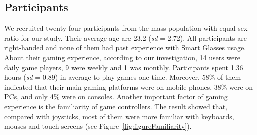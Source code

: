 \documentclass{sigchi}
\begin{document}
  \subsection {Participants}
  We recruited twenty-four participants from the mass population with equal sex ratio for our study. Their average age are 23.2 (\textsl{sd} = 2.72). All participants are right-handed and none of them had past experience with Smart Glasses usage. About their gaming experience, according to our investigation, 14 users were daily game players, 9 were weekly and 1 was monthly. Participants spent 1.36 hours (\textsl{sd} = 0.89) in average to play games one time. Moreover, 58\% of them indicated that their main gaming platforms were on mobile phones, 38\% were on PCs, and only 4\% were on consoles. Another important factor of gaming experience is the familiarity of game controllers. The result showed that, compared with joysticks, most of them were more familiar with keyboards, mouses and touch screens (see Figure~\ref{fig:figureFamiliarity}).
\end{document}
